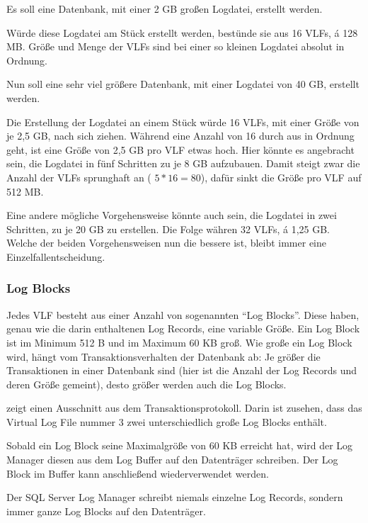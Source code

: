           Es soll eine Datenbank, mit einer 2 GB großen Logdatei, erstellt
          werden.
          
          Würde diese Logdatei am Stück erstellt werden, bestünde sie aus 16
          VLFs, \'a 128 MB. Größe und Menge der VLFs sind bei einer so kleinen
          Logdatei absolut in Ordnung.
          
          Nun soll eine sehr viel größere Datenbank, mit einer Logdatei von 40
          GB, erstellt werden.
          
          Die Erstellung der Logdatei an einem Stück würde 16 VLFs, mit einer
          Größe von je 2,5 GB, nach sich ziehen. Während eine Anzahl von 16
          durch aus in Ordnung geht, ist eine Größe von 2,5 GB pro VLF etwas hoch.
          Hier könnte es angebracht sein, die Logdatei in fünf Schritten zu je 8
          GB aufzubauen. Damit steigt zwar die Anzahl der VLFs sprunghaft an (
          $5 * 16 = 80$), dafür sinkt die Größe pro VLF auf 512 MB.
          
          Eine andere mögliche Vorgehensweise könnte auch sein, die Logdatei in
          zwei Schritten, zu je 20 GB zu erstellen. Die Folge währen 32 VLFs,
          \'a 1,25 GB. Welche der beiden Vorgehensweisen nun die bessere ist, bleibt
          immer eine Einzelfallentscheidung.
        \subsubsection{Log Blocks}
          Jedes VLF besteht aus einer Anzahl von sogenannten \enquote{Log
          Blocks}. Diese haben, genau wie die darin enthaltenen Log Records,
          eine variable Größe. Ein Log Block ist im Minimum 512 B und im Maximum 60
          KB groß. Wie große ein Log Block wird, hängt vom Transaktionsverhalten
          der Datenbank ab: Je größer die Transaktionen in einer Datenbank sind
          (hier ist die Anzahl der Log Records und deren Größe gemeint), desto
          größer werden auch die Log Blocks.
          
           zeigt einen Ausschnitt aus dem
          Transaktionsprotokoll. Darin ist zusehen, dass das Virtual Log File
          nummer 3 zwei unterschiedlich große Log Blocks enthält.
          
          Sobald ein Log Block seine Maximalgröße von 60 KB erreicht hat,
          wird der Log Manager diesen aus dem Log Buffer auf den Datenträger
          schreiben. Der Log Block im Buffer kann anschließend wiederverwendet
          werden.
          \begin{merke}
            Der SQL Server Log Manager schreibt niemals einzelne Log Records,
            sondern immer ganze Log Blocks auf den Datenträger.
          \end{merke}
          \begin{literaturinternet}
            \item \cite{MirDimSSTLP1LSaWALA}
          \end{literaturinternet}
